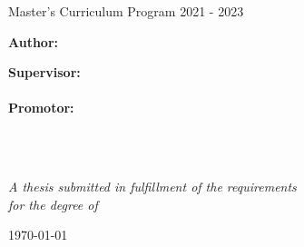 \begin{titlepage}
    \begin{center}
    
    \vspace*{.06\textheight}
    {\scshape\LARGE \univname\par \small Master's Curriculum Program 2021 - 2023}\vspace{1.5cm} %
    
    {\huge \bfseries \ttitle\par}\vspace{0.4cm} %
    {\emph{\large \subjectname}}\vspace{2.4cm}
     
    \begin{minipage}[t]{0.4\textwidth}
    \begin{flushleft} \large
    \textbf{Author:}\\
    \authorname %
    \end{flushleft}
    \end{minipage}
    \begin{minipage}[t]{0.4\textwidth}
    \begin{flushright} \large
    \textbf{Supervisor:} \\
    \supervisorname\vspace{0.2cm} \\
    \textbf{Promotor:} \\
    \promotor\vspace{0.2cm} \\
    \end{flushright}
    \end{minipage}\\[3cm]
     
    \vfill
    
    \large \textit{A thesis submitted in fulfillment of the requirements\\ for the degree
    of \degreename  }\\[0.3cm] %
    
     
    
    \vfill
    
    {\large \today}\\[4cm] %
     
    \vfill
    \end{center}
\end{titlepage}